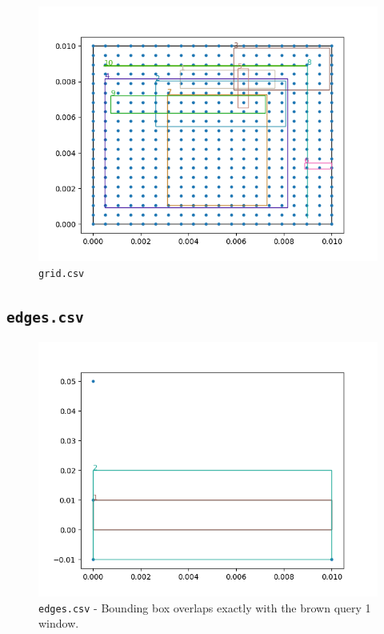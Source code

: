 \documentclass[12pt]{article}
\begin{document}
{\begin{figure}
    \centering
    \includegraphics[scale=0.8]{../img/grid.png}
    \caption{\texttt{grid.csv}}
    \label{fig:my_label}
\end{figure}


\subsection{\texttt{edges.csv}}

\begin{figure}
    \centering
    \includegraphics[scale=0.8]{../img/edges.png}
    \caption{\texttt{edges.csv} - Bounding box overlaps exactly with the brown query 1 window.}
    \label{fig:my_label}
\end{figure}

}
\end{document}
